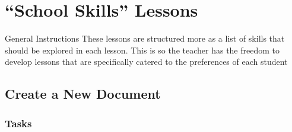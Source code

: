\documentclass[10pt,letterpaper,twoside]{report}
\begin{document}
\tableofcontents
\chapter{``School Skills'' Lessons}
General Instructions
These lessons are structured more as a list of skills that should be explored in each lesson. This is so the teacher has the freedom to develop lessons that are specifically catered to the preferences of each student
\section*{Create a New Document}
\subsection{Tasks}
\end{document}
